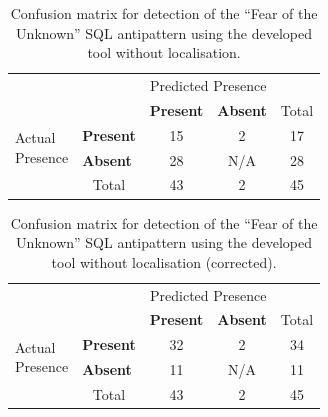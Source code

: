 \begin{table}[H]
    \centering
    \caption{Confusion matrix for detection of the “Fear of the Unknown” SQL antipattern using the developed tool without localisation.}
    \begin{tabular}{l|l|c|c|c}
        \multicolumn{2}{c}{}&\multicolumn{2}{c}{Predicted Presence}&\\
        \cline{3-4}
        \multicolumn{2}{c|}{}&\textbf{Present}&\textbf{Absent}&\multicolumn{1}{c}{Total}\\
        \cline{2-4}
        \multirow{2}{1.5cm}{Actual\\Presence}& \textbf{Present} & 15 & 2 & 17\\
        \cline{2-4}
        & \textbf{Absent} & 28 & N/A & 28\\
        \cline{2-4}
        \multicolumn{1}{c}{} & \multicolumn{1}{c}{Total} & \multicolumn{1}{c}{43} & \multicolumn{1}{c}{2} & \multicolumn{1}{c}{45}\\
    \end{tabular}
\end{table}

\begin{table}[H]
    \centering
    \caption{Confusion matrix for detection of the “Fear of the Unknown” SQL antipattern using the developed tool without localisation (corrected).}
    \begin{tabular}{l|l|c|c|c}
        \multicolumn{2}{c}{}&\multicolumn{2}{c}{Predicted Presence}&\\
        \cline{3-4}
        \multicolumn{2}{c|}{}&\textbf{Present}&\textbf{Absent}&\multicolumn{1}{c}{Total}\\
        \cline{2-4}
        \multirow{2}{1.5cm}{Actual\\Presence}& \textbf{Present} & 32 & 2 & 34\\
        \cline{2-4}
        & \textbf{Absent} & 11 & N/A & 11\\
        \cline{2-4}
        \multicolumn{1}{c}{} & \multicolumn{1}{c}{Total} & \multicolumn{1}{c}{43} & \multicolumn{1}{c}{2} & \multicolumn{1}{c}{45}\\
    \end{tabular}
\end{table}

